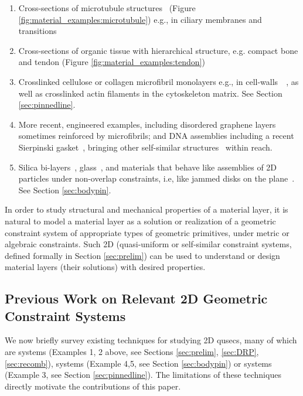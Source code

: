 \begin{enumerate}
    \item Cross-sections of microtubule structures~\cite{microtubule_necklace} (Figure \ref{fig:material_examples:microtubule}) e.g., in ciliary membranes and transitions~\cite{microtubule_cilia}

    \item Cross-sections of organic tissue with hierarchical structure, e.g. compact bone and tendon (Figure \ref{fig:material_examples:tendon}) \uncited

    \item Crosslinked cellulose or collagen microfibril monolayers e.g., in cell-walls~\cite{wikimediacommons2010afm}~\cite{wikimediacommons2007plant}, as well as crosslinked actin filaments in the cytoskeleton matrix. See Section \ref{sec:pinnedline}.

    \item More recent, engineered examples, including disordered
    graphene layers~\cite{Graphene1}~\cite{Graphene2} sometimes
    reinforced by microfibrils; and DNA assemblies including a recent
    Sierpinski gasket~\cite{self_assembly_sierpinski}, bringing other
    self-similar structures~\cite{wikimediacommons2012subdivision} within reach.

    \item Silica bi-layers~\cite{silica_bilayers}, glass~\cite{sructure_of_2d_glass}, and
    materials that behave like assemblies of 2D particles under
    non-overlap constraints, i.e, like jammed disks on the plane~\cite{jammed_disks}. See Section \ref{sec:bodypin}.
\end{enumerate}
%
In order to study structural and mechanical properties
of a material layer, it is natural to model a material layer as a solution or
realization of a geometric constraint system of appropriate types of geometric
primitives, under metric or algebraic constraints. Such 2D
 (quasi-uniform or self-similar constraint systems, defined
formally in Section \ref{sec:prelim}) can be
used to understand or design material layers (their solutions) with
desired properties.
%
\subsection{Previous Work on Relevant 2D Geometric Constraint Systems}
We now briefly survey existing techniques for studying 2D
qusecs,  many of which are  systems
(Examples 1, 2 above, see Sections \ref{sec:prelim}, \ref{sec:DRP}, \ref{sec:recomb}),
 systems (Example 4,5, see Section
\ref{sec:bodypin}) or  systems (Example
3, see Section \ref{sec:pinnedline}). The limitations of these
techniques directly motivate the contributions of this paper.

